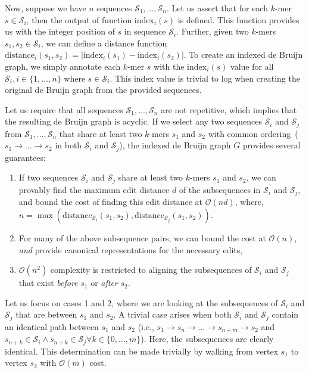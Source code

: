 \documentclass[phd]{ucbthesis}
\begin{document}
Now, suppose we have $n$ sequences $\mathcal{S}_1, \dots, \mathcal{S}_n$. Let us assert that for each
$k$-mer $s \in \mathcal{S}_i$, then the output of function $\text{index}_i(s)$ is defined. This function
provides us with the integer position of $s$ in sequence $\mathcal{S}_i$. Further, given two $k$-mers
$s_1, s_2 \in \mathcal{S}_i$, we can define a distance function
$\text{distance}_i(s_1, s_2) = | \text{index}_i(s_1) - \text{index}_i(s_2) |$. To create an indexed
de Bruijn graph, we simply annotate each $k$-mer $s$ with the $\text{index}_i(s)$ value for all
$\mathcal{S}_i, i \in \{1, \dots, n\}$ where $s \in \mathcal{S}_i$. This index value is trivial to log when
creating the original de Bruijn graph from the provided sequences.

Let us require that all sequences $\mathcal{S}_1, \dots, \mathcal{S}_n$ are not repetitive, which implies
that the resulting de Bruijn graph is acyclic. If we select any two sequences $\mathcal{S}_i$ and
$\mathcal{S}_j$ from $\mathcal{S}_1, \dots, \mathcal{S}_n$ that share at least two $k$-mers $s_1$ and
$s_2$ with common ordering~($s_1 \rightarrow \dots \rightarrow s_2$ in both $\mathcal{S}_i$ and
$\mathcal{S}_j$), the indexed de Bruijn graph $G$ provides several guarantees:

\begin{enumerate}
\item If two sequences $\mathcal{S}_i$ and $\mathcal{S}_j$ share at least two $k$-mers $s_1$ and
$s_2$, we can provably find the maximum edit distance $d$ of the subsequences in $\mathcal{S}_i$ and
$\mathcal{S}_j$, and bound the cost of finding this edit distance at $\mathcal{O}(nd)$, where,
$n = \max(\text{distance}_{\mathcal{S}_i}(s_1, s_2), \text{distance}_{\mathcal{S}_j}(s_1, s_2))$.
\item For many of the above subsequence pairs, we can bound the cost at $\mathcal{O}(n)$, \emph{and}
provide canonical representations for the necessary edits,
\item $\mathcal{O}(n^2)$ complexity is restricted to aligning the subsequences of $\mathcal{S}_i$ and
$\mathcal{S}_j$ that exist \emph{before} $s_1$ or \emph{after} $s_2$.
\end{enumerate}

Let us focus on cases 1 and 2, where we are looking at the subsequences of $\mathcal{S}_i$ and
$\mathcal{S}_j$ that are between $s_1$ and $s_2$. A trivial case arises when both $\mathcal{S}_i$ and
$\mathcal{S}_j$ contain an identical path between $s_1$ and $s_2$ (i.e.,
$s_1 \rightarrow s_n \rightarrow \dots \rightarrow s_{n + m} \rightarrow s_2$ and
$s_{n + k} \in \mathcal{S}_i \wedge s_{n + k} \in \mathcal{S}_j \forall k \in \{0, \dots , m\}$). Here, the
subsequences are clearly identical. This determination can be made trivially by walking from vertex $s_1$
to vertex $s_2$ with $\mathcal{O}(m)$ cost.
\end{document}

